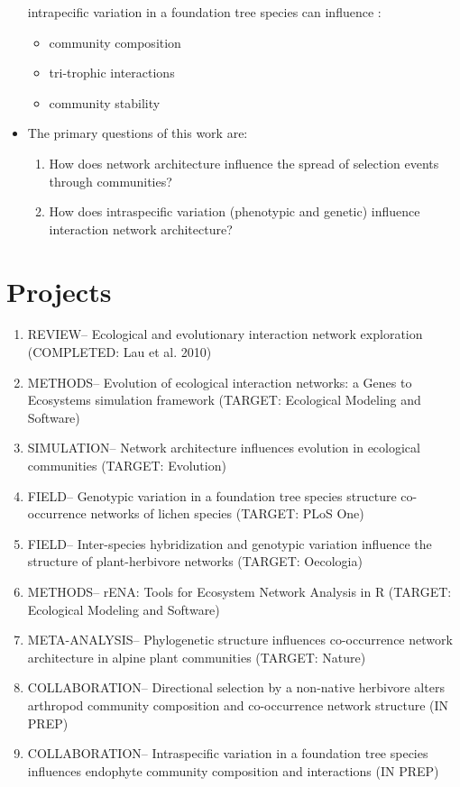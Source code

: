 \documentclass[12pt]{article}
\begin{document}
\begin{itemize}
  intrapecific variation in a foundation tree species can influence
  \cite{whitham2006}:
  \begin{itemize}
  \item community composition 
  \item tri-trophic interactions 
  \item community stability
  \end{itemize}
\item The primary questions of this work are:
  \begin{enumerate}
  \item How does network architecture influence the spread of
    selection events through communities?
  \item How does intraspecific variation (phenotypic and genetic)
    influence interaction network architecture?
  \end{enumerate}
\end{itemize}

\section{Projects}

\begin{enumerate}
\item REVIEW-- Ecological and evolutionary interaction network exploration
  (COMPLETED: Lau et al. 2010)
\item METHODS-- Evolution of ecological interaction networks: a Genes to
  Ecosystems simulation framework (TARGET: Ecological Modeling and Software)
\item SIMULATION-- Network architecture influences evolution in ecological
  communities (TARGET: Evolution)
\item FIELD-- Genotypic variation in a foundation tree species structure
  co-occurrence networks of lichen species (TARGET: PLoS One)
\item FIELD-- Inter-species hybridization and genotypic variation
  influence the structure of plant-herbivore networks (TARGET:
  Oecologia)
\item METHODS-- rENA: Tools for Ecosystem Network Analysis in R
  (TARGET: Ecological Modeling and Software)
\item META-ANALYSIS-- Phylogenetic structure influences co-occurrence network
  architecture in alpine plant communities (TARGET: Nature)
\item COLLABORATION-- Directional selection by a non-native herbivore
  alters arthropod community composition and co-occurrence network
  structure (IN PREP)
\item COLLABORATION-- Intraspecific variation in a foundation tree
  species influences endophyte community composition and interactions
  (IN PREP)
\end{enumerate}
\end{document}
